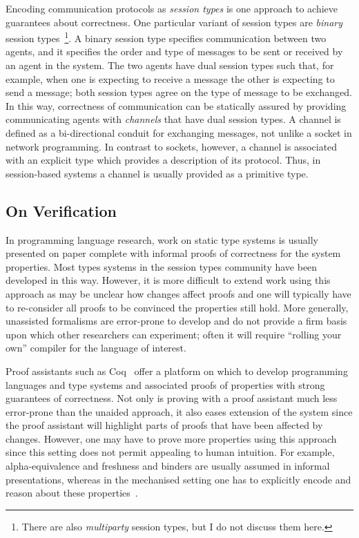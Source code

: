 \documentclass{mprop}
\begin{document}
Encoding communication protocols as \textit{session types} is one approach to achieve guarantees about correctness. One particular variant of session types are \textit{binary} session types~\footnote{There are also \textit{multiparty} session types, but I do not discuss them here.}. A binary session type specifies communication between two agents, and it specifies the order and type of messages to be sent or received by an agent in the system. The two agents have dual session types such that, for example, when one is expecting to receive a message the other is expecting to send a message; both session types agree on the type of message to be exchanged. In this way, correctness of communication can be statically assured by providing communicating agents with \textit{channels} that have dual session types. A channel is defined as a bi-directional conduit for exchanging messages, not unlike a socket in network programming. In contrast to sockets, however, a channel is associated with an explicit type which provides a description of its protocol. Thus, in session-based systems a channel is usually provided as a primitive type.

\subsection{On Verification}

In programming language research, work on static type systems is usually presented on paper complete with informal proofs of correctness for the system properties. Most types systems in the session types community have been developed in this way. However, it is more difficult to extend work using this approach as may be unclear how changes affect proofs and one will typically have to re-consider all proofs to be convinced the properties still hold. More generally, unassisted formalisms are error-prone to develop and do not provide a firm basis upon which other researchers can experiment; often it will require ``rolling your own'' compiler for the language of interest.

Proof assistants such as Coq~\cite{Coq:manual} offer a platform on which to develop programming languages and type systems and associated proofs of properties with strong guarantees of correctness. Not only is proving with a proof assistant much less error-prone than the unaided approach, it also eases extension of the system since the proof assistant will highlight parts of proofs that have been affected by changes. However, one may have to prove more properties using this approach since this setting does not permit appealing to human intuition. For example, alpha-equivalence and freshness and binders are usually assumed in informal presentations, whereas in the mechanised setting one has to explicitly encode and reason about these properties~\cite{Aydemir:2005:MMM, Aydemir:2008:EFM}.
\end{document}
